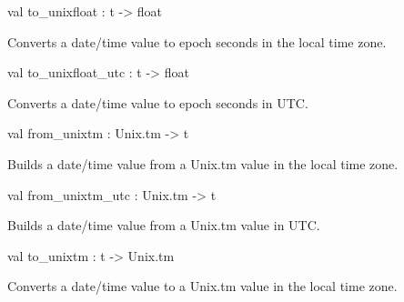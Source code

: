 \documentclass[11pt]{article}
\begin{document}
\label{val:XmlRpcDateTime.to-underscoreunixfloat}\begin{ocamldoccode}
val to_unixfloat : t -> float
\end{ocamldoccode}
\begin{ocamldocdescription}
Converts a date/time value to epoch seconds in the local time zone.


\end{ocamldocdescription}




\label{val:XmlRpcDateTime.to-underscoreunixfloat-underscoreutc}\begin{ocamldoccode}
val to_unixfloat_utc : t -> float
\end{ocamldoccode}
\begin{ocamldocdescription}
Converts a date/time value to epoch seconds in UTC.


\end{ocamldocdescription}




\label{val:XmlRpcDateTime.from-underscoreunixtm}\begin{ocamldoccode}
val from_unixtm : Unix.tm -> t
\end{ocamldoccode}
\begin{ocamldocdescription}
Builds a date/time value from a Unix.tm value in the local time zone.


\end{ocamldocdescription}




\label{val:XmlRpcDateTime.from-underscoreunixtm-underscoreutc}\begin{ocamldoccode}
val from_unixtm_utc : Unix.tm -> t
\end{ocamldoccode}
\begin{ocamldocdescription}
Builds a date/time value from a Unix.tm value in UTC.


\end{ocamldocdescription}




\label{val:XmlRpcDateTime.to-underscoreunixtm}\begin{ocamldoccode}
val to_unixtm : t -> Unix.tm
\end{ocamldoccode}
\begin{ocamldocdescription}
Converts a date/time value to a Unix.tm value in the local time zone.


\end{ocamldocdescription}
\end{document}
